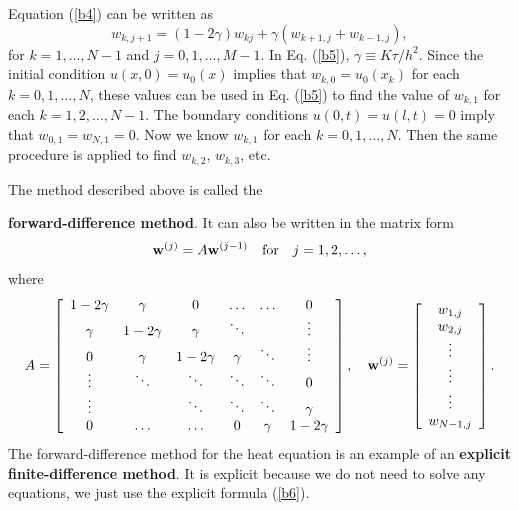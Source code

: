 {Equation (\ref{b4}) can be written as
\begin{equation}
w_{k,j+1}=\left(1-2\gamma\right)w_{kj}+
\gamma\left(
w_{k+1, j}+w_{k-1,j}\right), \label{b5}
\end{equation}
for $k=1,\dots,N-1$ and
$j=0,1,\dots, M-1$. In Eq. (\ref{b5}),
$\gamma\equiv K\tau/h^{2}$. Since the initial condition $u(x,0)=u_{0}(x)$
implies that $w_{k,0}=u_{0}(x_{k})$ for each $k=0, 1, \dots, N$, these values can be used in
Eq. (\ref{b5}) to find the value of $w_{k,1}$ for each $k=1, 2, \dots, N-1$. The boundary conditions
$u(0,t)=u(l,t)=0$ imply that $w_{0,1}=w_{N,1}=0$. Now we know $w_{k,1}$ for each $k=0,1,\dots, N$.
Then the same procedure is applied to find $w_{k,2}$, $w_{k,3}$, etc.


 
 
The method described above is called the {{\bf forward-difference method}.
It can also be written in the matrix form
\begin{equation}
{\bf w}^{(j)}=A{\bf w}^{(j-1)} \quad \hbox{for} \quad j=1,2,\dots, \label{b6}
\end{equation}
where
\begin{equation}
A=\left[
\begin{array}{cccccc}
1-2\gamma &\gamma &0      &\dots  &\dots &0 \\
\gamma &1-2\gamma &\gamma &\ddots  &     &\vdots \\
0      &\gamma &1-2\gamma &\gamma &\ddots &\vdots \\
\vdots &\ddots &\ddots &\ddots &\ddots &0 \\
\vdots &       &\ddots &\ddots &\ddots &\gamma \\
0      &\dots  &\dots  &0      &\gamma &1-2\gamma
\end{array}\right], \quad
{\bf w}^{(j)}=\left[
\begin{array}{c}
w_{1,j} \\
w_{2,j} \\
\vdots \\
\vdots \\
\vdots \\
w_{N-1,j}
\end{array}\right].
\label{b7}
\end{equation}
The forward-difference method for the heat equation is an example of an {\bf explicit finite-difference method}.
It is explicit because we do not need to solve any equations, we just use the explicit formula (\ref{b6}).
\begin{figure}[h]
\centering

\end{figure}}}
